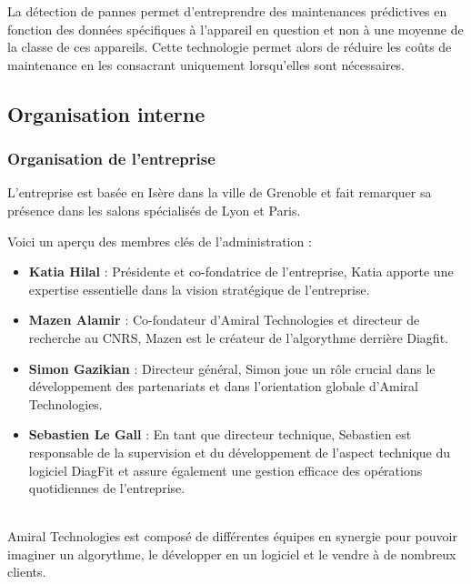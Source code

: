 La détection de pannes permet d'entreprendre des maintenances prédictives en fonction des données spécifiques à l'appareil en question et non à une moyenne de la classe de ces appareils.
Cette technologie permet alors de réduire les coûts de maintenance en les consacrant uniquement lorsqu'elles sont nécessaires.

\subsection{Organisation interne}
\subsubsection{Organisation de l'entreprise }
L'entreprise est basée en Isère dans la ville de Grenoble et fait remarquer sa présence dans les salons spécialisés de Lyon et Paris.

Voici un aperçu des membres clés de l'administration :
\begin{itemize}
    \item \textbf{Katia Hilal} : Présidente et co-fondatrice de l'entreprise, Katia apporte une expertise essentielle dans la vision stratégique de l'entreprise.
    \item \textbf{Mazen Alamir} : Co-fondateur d'Amiral Technologies et directeur de recherche au CNRS, Mazen est le créateur de l'algorythme derrière Diagfit.
    \item \textbf{Simon Gazikian} : Directeur général, Simon joue un rôle crucial dans le développement des partenariats et dans l'orientation globale d'Amiral Technologies.
    \item \textbf{Sebastien Le Gall} : En tant que directeur technique, Sebastien est responsable de la supervision et du développement de l'aspect technique du logiciel DiagFit et assure également une gestion efficace des opérations quotidiennes de l'entreprise.
\end{itemize}\phantom{vide pour separer}\\

Amiral Technologies est composé de différentes équipes en synergie pour pouvoir imaginer un algorythme, le développer en un logiciel et le vendre à de nombreux clients.

